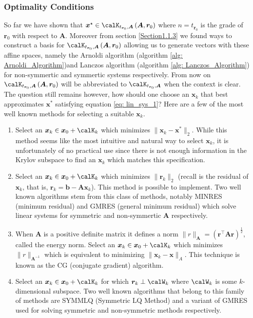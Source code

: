 \subsubsection{Optimality Conditions}\label{Section1.1.4}

So far we have shown that $\bm{x}^{\star} \in \calK_{t_{\bm{r}_0}, \bm{A}} \left( \bm{A}, \bm{r}_0 \right)$ where $n = t_{\bm{r}_0}$ is the grade of $\bm{r}_0$ with respect to $\bm{A}$. Moreover from section \ref{Section1.1.3} we found ways to construct a basis for $\calK_{t_{\bm{r}_0}, \bm{A}} \left( \bm{A}, \bm{r}_0 \right)$ allowing us to generate vectors with these affine spaces, namely the Arnoldi algorithm (algorithm \ref{alg: Arnoldi_Algorithm})and Lanczos algorithm (algorithm \ref{alg: Lanczos_Algorithm}) for non-symmertic and symmertic systems respectively. From now on $\calK_{t_{\bm{r}_0}, \bm{A}} \left( \bm{A}, \bm{r}_0 \right)$ will be abbreviated to $\calK_{t_{\bm{r}_0}, \bm{A}}$ when the context is clear. The question still remains however, how should one choose an $\bm{x}_k$ that best approximates $\bm{x}^{\ast}$ satisfying equation \ref{eq: lin_sys_1}? Here are a few of the most well known methods for selecting a suitable $\bm{x}_k$.

\begin{enumerate}

    \item Select an $\bm{x}_k \in \bm{x}_0 + \calK_k$ which minimizes $\| \bm{x}_k - \bm{x}^{\ast} \|_2$. While this method seems like the most intuitive and natural way to select $\bm{x}_k$, it is unfortunately of no practical use since there is not enough information in the Krylov subspace to find an $\bm{x}_k$ which matches this specification.

    \item Select an $\bm{x}_k \in \bm{x}_0 + \calK_k$ which minimizes $\| \bm{r}_k \|_2$ (recall is the residual of $\bm{x}_k$, that is, $\bm{r}_k = \bm{b} - \bm{A} \bm{x}_k$). This method is possible to implement. Two well known algorithms stem from this class of methods, notably MINRES (minimum residual) and GMRES (general minimum residual) which solve linear systems for symmetric and non-symmertic $\bm{A}$ respectively.

    \item When $\bm{A}$ is a positive definite matrix it defines a norm $\| r \|_{\bm{A}} = \left( \bm{r}^{\intercal} \bm{A} \bm{r} \right)^{\frac{1}{2}}$, called the energy norm. Select an $\bm{x}_k \in \bm{x}_0 + \calK_k$ which minimizes $\| r \|_{\bm{A}^{-1}}$ which is equivalent to minimizing $\| \bm{x}_k - \bm{x} \|_{A}$. This technique is known as the CG (conjugate gradient) algorithm.

    \item Select an $\bm{x}_k \in \bm{x}_0 + \calK_k$ for which $\bm{r}_{k} \perp \calW_k$ where $\calW_k$ is some $k$-dimensional subspace. Two well known algorithms that belong to this family of methods are SYMMLQ (Symmetric LQ Method) and a variant of GMRES used for solving symmetric and non-symmetric methods respectively.

\end{enumerate}

